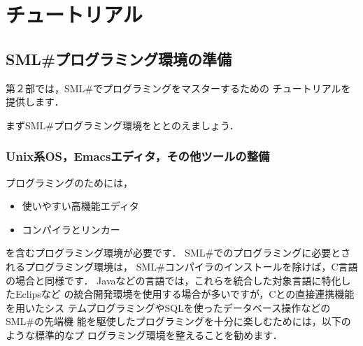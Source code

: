 \documentclass{jbook}
\newcommand{\smlsharp}{SML\#}
\begin{document}
\part{チュートリアル}
\label{part:tutorial}

\chapter{\smlsharp{}プログラミング環境の準備}
\label{chap:tutorialEnvironment}

	第２部では，\smlsharp{}でプログラミングをマスターするための
チュートリアルを提供します．

	まず\smlsharp{}プログラミング環境をととのえましょう．

\section{Unix系OS，Emacsエディタ，その他ツールの整備}
\label{sec:tutorialEnvironmemt}

	プログラミングのためには，
\begin{itemize}
\item 使いやすい高機能エディタ
\item コンパイラとリンカー
\end{itemize}
を含むプログラミング環境が必要です．
	\smlsharp{}でのプログラミングに必要とされるプログラミング環境は，
\smlsharp{}コンパイラのインストールを除けば，C言語の場合と同様です．
	Javaなどの言語では，これらを統合した対象言語に特化したEclipsなど
の統合開発環境を使用する場合が多いですが，Cとの直接連携機能を用いたシス
テムプログラミングやSQLを使ったデータベース操作などの\smlsharp{}の先端機
能を駆使したプログラミングを十分に楽しむためには，以下のような標準的なプ
ログラミング環境を整えることを勧めます．
\end{document}
